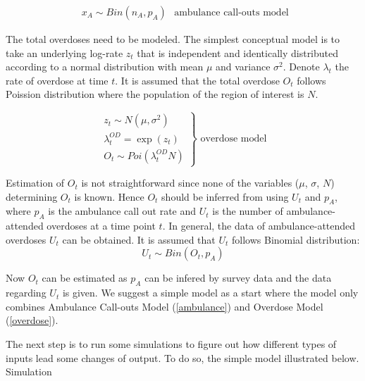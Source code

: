 \documentclass[
10pt, %
a4paper, %
oneside, %
headinclude,footinclude, %
BCOR5mm, %
]{scrartcl}
\begin{document}
\begin{equation}
\label{ambulance}
	\left.\begin{aligned}
	x_{A} \sim Bin(n_{A},p_{A})
	\end{aligned}\right.
	\text{		ambulance call-outs model}
\end{equation}

The total overdoses need to be modeled. The simplest conceptual model is to take an underlying log-rate $z_t$ that is independent and identically distributed according to a normal distribution with mean $\mu$ and variance $\sigma^2$. \cite{Irvine:modelling} Denote $\lambda_{t}$ the rate of overdose at time $t$. It is assumed that the total overdose $O_t$ follows Poission distribution where the population of the region of interest is $N$. 

\begin{equation}
\label{overdose}
\left.\begin{aligned}
z_{t} \sim N(\mu, \sigma^{2}) \\
\lambda_{t}^{OD} = \exp(z_{t})\\
O_{t} \sim Poi(\lambda_{t}^{OD}N) 
\end{aligned}\right\} 
\text{		overdose model} 
\end{equation}



Estimation of $O_t$ is not straightforward since none of the variables ($\mu$, $\sigma$, $N$) determining $O_t$  is known. Hence $O_t$ should be inferred from using $U_t$ and \(p_A\), where $p_A$ is the ambulance call out rate and \(U_t\) is the number of  ambulance-attended overdoses at a time point $t$. In general, the data of ambulance-attended overdoses \(U_t\) can be obtained. It is assumed that  \(U_t\) follows Binomial distribution: 
\begin{equation}
\label{over_amb}
\left.
U_t \sim Bin(O_t, p_A)
\right.
\end{equation}

Now $O_t$ can be estimated as $p_A$ can be infered by survey data and the data regarding $U_t$ is given. We suggest a simple model as a start where the model only combines Ambulance Call-outs Model (\ref{ambulance}) and Overdose Model (\ref{overdose}). 

The next step is to run some simulations to figure out how different types of inputs lead some changes of output. To do so, the simple model illustrated below.\\

\LARGE Simulation \\
\end{document}
